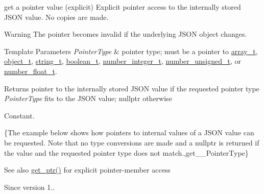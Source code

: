 get a pointer value (explicit) Explicit pointer access to the internally stored J\+S\+ON value. No copies are made.

\begin{DoxyWarning}{Warning}
The pointer becomes invalid if the underlying J\+S\+ON object changes.
\end{DoxyWarning}

\begin{DoxyTemplParams}{Template Parameters}
{\em Pointer\+Type} & pointer type; must be a pointer to \hyperlink{classnlohmann_1_1basic__json_ab00b882d39306d663c23dab110f5cae0}{array\+\_\+t}, \hyperlink{classnlohmann_1_1basic__json_a0ac9894c9de8dc551cf2e5f1c605537f}{object\+\_\+t}, \hyperlink{classnlohmann_1_1basic__json_ab63e618bbb0371042b1bec17f5891f42}{string\+\_\+t}, \hyperlink{classnlohmann_1_1basic__json_af3bc3e83aa162d7ba4df16a949872723}{boolean\+\_\+t}, \hyperlink{classnlohmann_1_1basic__json_ac4b10b2364f26ce47bdb9a413ff04a59}{number\+\_\+integer\+\_\+t}, \hyperlink{classnlohmann_1_1basic__json_a60a04166c122072ab11eaf9845d9cd1d}{number\+\_\+unsigned\+\_\+t}, or \hyperlink{classnlohmann_1_1basic__json_a74a0013e847fdc574b48f931f0e757e1}{number\+\_\+float\+\_\+t}.\\
\hline
\end{DoxyTemplParams}
\begin{DoxyReturn}{Returns}
pointer to the internally stored J\+S\+ON value if the requested pointer type {\itshape Pointer\+Type} fits to the J\+S\+ON value; {\ttfamily nullptr} otherwise
\end{DoxyReturn}
Constant.

\{The example below shows how pointers to internal values of a J\+S\+ON value can be requested. Note that no type conversions are made and a {\ttfamily nullptr} is returned if the value and the requested pointer type does not match.,get\+\_\+\+\_\+\+Pointer\+Type\}

\begin{DoxySeeAlso}{See also}
\hyperlink{classnlohmann_1_1basic__json_a7ab11375ed2e29c2fcb6119386851445}{get\+\_\+ptr()} for explicit pointer-\/member access
\end{DoxySeeAlso}
\begin{DoxySince}{Since}
version 1.. 
\end{DoxySince}
\hypertarget{classnlohmann_1_1basic__json_a7ab11375ed2e29c2fcb6119386851445}{}\label{classnlohmann_1_1basic__json_a7ab11375ed2e29c2fcb6119386851445} 

